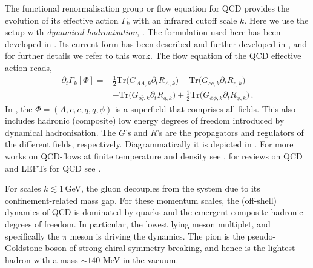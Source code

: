 \documentclass[%
reprint,
superscriptaddress,
showpacs,preprintnumbers,
amsmath,amssymb,
aps,
prd,
]{revtex4-1}
\def\Fig#1{\Cref{#1}}
\def\eq#1{\Cref{#1}}
\begin{document}
The functional renormalisation group or flow equation for QCD provides the evolution of its effective action $\Gamma_k$ with an  infrared cutoff scale $k$. Here we use  the setup with \textit{dynamical hadronisation}, \cite{Gies:2001nw, Gies:2002hq, Pawlowski:2005xe, Braun:2008pi, Floerchinger:2009uf, Fu:2019hdw}. The formulation used here has been developed in \cite{Mitter:2014wpa, Braun:2014ata, Rennecke:2015eba, Cyrol:2017ewj, Fu:2019hdw}. Its current form has been described and further developed in \cite{Fu:2019hdw}, and for further details we refer to this work. The flow equation of the QCD effective action reads, 
%
\begin{align}
\partial_t\Gamma_k[\Phi]=&\frac{1}{2}\mathrm{Tr}\Big(G_{AA,k}\partial_t R_{A,k}\Big)-\mathrm{Tr}\Big(G_{c\bar c,k}\partial_t R_{c,k}\Big)\nonumber\\[2ex]
&-\mathrm{Tr}\Big(G_{q\bar q,k}\partial_t R_{q,k}\Big)+\frac{1}{2}\mathrm{Tr}\Big(G_{\phi\phi,k}\partial_t R_{\phi,k}\Big)\,.\label{eq:QCDflow}
\end{align}
%
In \eq{eq:QCDflow}, the $\Phi=(A, c, \bar c, q,\bar q,\phi)$ is a superfield that comprises all fields. This also includes hadronic (composite) low energy degrees of freedom introduced by dynamical hadronisation. The $G$'s and $R$'s are the propagators and regulators of the different fields, respectively. Diagrammatically it is depicted in \Fig{fig:QCD_equation}. For more works on QCD-flows at finite temperature and density see \cite{Braun:2007bx, Braun:2008pi, Braun:2009gm, Mitter:2014wpa,  Braun:2014ata, Rennecke:2015eba,  Cyrol:2016tym, Cyrol:2017ewj, Cyrol:2017qkl, Fu:2019hdw, Braun:2020ada, Braun:2020mhk}, for reviews on QCD and LEFTs for QCD see \cite{Litim:1998nf, Berges:2000ew, Pawlowski:2005xe, Schaefer:2006sr, Gies:2006wv, Rosten:2010vm, Braun:2011pp, Pawlowski:2014aha, Dupuis:2020fhh}.
	
For scales $k\lesssim 1$\,GeV, the gluon decouples from the system due to its confinement-related mass gap. For these momentum scales, the (off-shell) dynamics of QCD is dominated by quarks and the emergent composite hadronic degrees of freedom. In particular, the lowest lying meson multiplet, and specifically the $\pi$ meson is driving the dynamics. The pion is the pseudo-Goldstone boson of strong chiral symmetry breaking, and hence is the lightest hadron with a mass $\sim 140$ MeV in the vacuum. 
\end{document}
